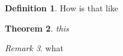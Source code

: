 \documentclass[11pt]{article}
\theoremstyle{plain}
\newtheorem{thm}{Theorem}
\theoremstyle{definition}
\newtheorem{defn}[thm]{Definition}
\theoremstyle{remark}
\newtheorem{rmk}[thm]{Remark}
\begin{document}
    \begin{defn}
        How is that like
    \end{defn}
    \begin{thm}
        this
    \end{thm}
    \begin{rmk}
        what
    \end{rmk}
\end{document}
